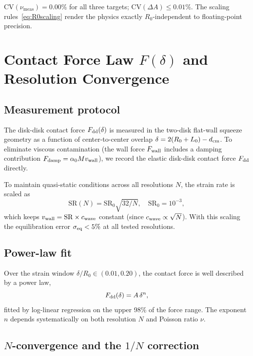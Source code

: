 \documentclass[aps,pre,twocolumn,floatfix,longbibliography]{revtex4-2}
\newcommand{\numes}{\nu_{\mathrm{meas}}}
\newcommand{\dA}{\Delta A}
\newcommand{\SR}{\mathrm{SR}}
\newcommand{\cv}{\mathrm{CV}}
\begin{document}
$\cv(\numes) = 0.00\%$ for all three targets; $\cv(\dA) \leq 0.01\%$.
The scaling rules~\eqref{eq:R0scaling} render the physics exactly
$R_0$-independent to floating-point precision.

\section{Contact Force Law $F(\delta)$ and Resolution Convergence}
\label{sec:contactlaw}

\subsection{Measurement protocol}

The disk-disk contact force $F_{\rm dd}(\delta)$ is measured in the two-disk
flat-wall squeeze geometry as a function of center-to-center overlap
$\delta = 2(R_0 + L_0) - d_{\rm cm}$.  To eliminate viscous contamination
(the wall force $F_{\rm wall}$ includes a damping contribution
$F_{\rm damp} = \alpha_0 M v_{\rm wall}$), we record the elastic
disk-disk contact force $F_{\rm dd}$ directly.

To maintain quasi-static conditions across all resolutions $N$, the strain
rate is scaled as
\begin{equation}
  \SR(N) = \SR_0 \sqrt{32/N}, \quad \SR_0 = 10^{-3},
  \label{eq:SR_scaled}
\end{equation}
which keeps $v_{\rm wall} = \SR \times c_{\rm wave}$ constant (since
$c_{\rm wave} \propto \sqrt{N}$).  With this scaling the equilibration
error $\sigma_{\rm eq} < 5\%$ at all tested resolutions.

\subsection{Power-law fit}

Over the strain window $\delta/R_0 \in (0.01, 0.20)$, the contact force
is well described by a power law,
\begin{equation}
  F_{\rm dd}(\delta) = A\,\delta^n,
  \label{eq:Fdd_powerlaw}
\end{equation}
fitted by log-linear regression on the upper 98\% of the force range.
The exponent $n$ depends systematically on both resolution $N$ and Poisson
ratio $\nu$.

\subsection{$N$-convergence and the $1/N$ correction}
\label{sec:n_convergence}
\end{document}
